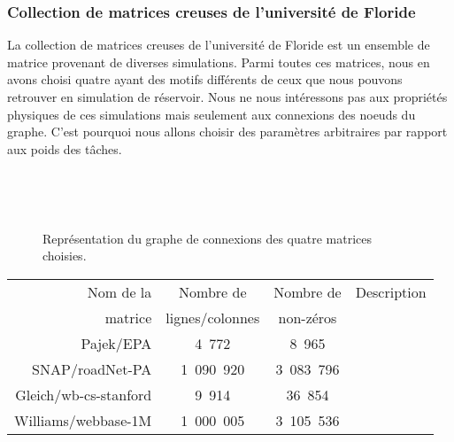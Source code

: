 \subsubsection{Collection de matrices creuses de l'université de Floride}
La collection de matrices creuses de l'université de Floride est un ensemble de matrice provenant de diverses simulations.
%
Parmi toutes ces matrices, nous en avons choisi quatre ayant des motifs différents de ceux que nous pouvons retrouver en simulation de réservoir.
%
Nous ne nous intéressons pas aux propriétés physiques de ces simulations mais seulement aux connexions des noeuds du graphe.
%
C'est pourquoi nous allons choisir des paramètres arbitraires par rapport aux poids des tâches.


\begin{figure}[!h]
     \begin{center}
        ~

        ~
    \end{center}
    \caption{Représentation du graphe de connexions des quatre matrices choisies.}
    \label{fig:florida}
\end{figure}

\begin{center}
  \begin{tabular}{|r|c|c|c|}
    \hline
    Nom de la & Nombre de       & Nombre de & Description\\
    matrice   & lignes/colonnes & non-zéros &  \\
    \hline
    Pajek/EPA             & 4~772     & 8~965     & \\
    SNAP/roadNet-PA       & 1~090~920 & 3~083~796 & \\
    Gleich/wb-cs-stanford & 9~914     & 36~854    & \\
    Williams/webbase-1M   & 1~000~005 & 3~105~536 & \\
    \hline
  \end{tabular}
  \label{tab:florida}
\end{center}
